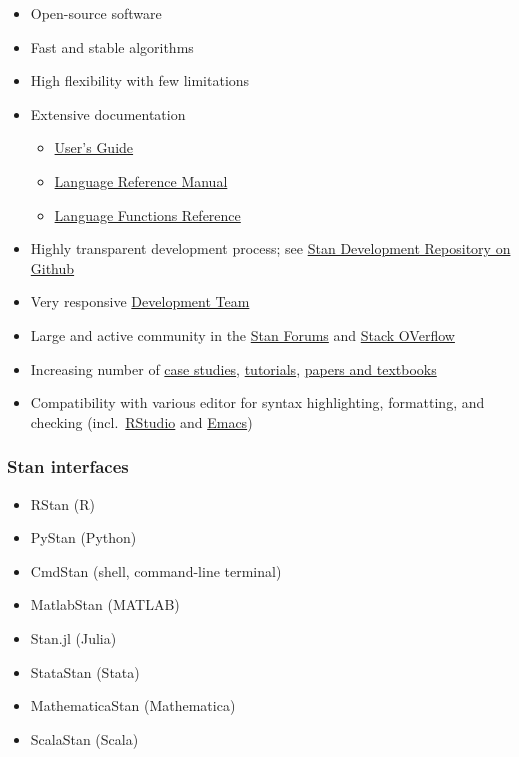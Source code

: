 \documentclass[
  11pt,
]{article}
\providecommand{\tightlist}{%
  \setlength{\itemsep}{0pt}\setlength{\parskip}{0pt}}
\begin{document}
\begin{itemize}
\tightlist
\item
  Open-source software
\item
  Fast and stable algorithms
\item
  High flexibility with few limitations
\item
  Extensive documentation

  \begin{itemize}
  \tightlist
  \item
    \href{https://mc-stan.org/docs/2_19/stan-users-guide/index.html}{User's Guide}
  \item
    \href{https://mc-stan.org/docs/2_19/reference-manual/index.html}{Language Reference Manual}
  \item
    \href{https://mc-stan.org/docs/2_19/functions-reference/index.html}{Language Functions Reference}
  \end{itemize}
\item
  Highly transparent development process; see \href{https://github.com/stan-dev/stan}{Stan Development Repository on Github}
\item
  Very responsive \href{https://mc-stan.org/about/team/}{Development Team}
\item
  Large and active community in the \href{https://discourse.mc-stan.org/}{Stan Forums} and \href{https://stackoverflow.com/questions/tagged/stan}{Stack OVerflow}
\item
  Increasing number of \href{https://mc-stan.org/users/documentation/case-studies.html}{case studies}, \href{https://mc-stan.org/users/documentation/tutorials.html}{tutorials}, \href{https://mc-stan.org/users/documentation/external.html}{papers and textbooks}
\item
  Compatibility with various editor for syntax highlighting, formatting, and checking (incl.~\href{https://www.rstudio.com/}{RStudio} and \href{https://www.gnu.org/software/emacs/}{Emacs})
\end{itemize}

\hypertarget{stan-interfaces}{%
\subsubsection{Stan interfaces}\label{stan-interfaces}}

\begin{itemize}
\tightlist
\item
  RStan (R)
\item
  PyStan (Python)
\item
  CmdStan (shell, command-line terminal)
\item
  MatlabStan (MATLAB)
\item
  Stan.jl (Julia)
\item
  StataStan (Stata)
\item
  MathematicaStan (Mathematica)
\item
  ScalaStan (Scala)
\end{itemize}
\end{document}
